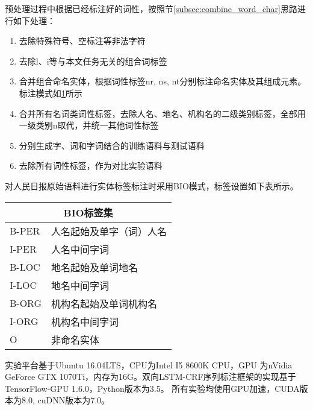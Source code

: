 预处理过程中根据已经标注好的词性，按照节\ref{subsec:combine_word_char}思路进行如下处理：
\begin{enumerate}[leftmargin=*]
    \item[(1)] 去除特殊符号、空标注等非法字符
    \item[(2)] 去除l、i等与本文任务无关的组合词标签
    \item[(3)] 合并组合命名实体，根据词性标签nr, ns, nt分别标注命名实体及其组成元素。标注模式如\ref{tab:label_schema}所示
    \item[(4)] 合并所有名词类词性标签，去除人名、地名、机构名的二级类别标签，全部用一级类别n取代，并统一其他词性标签
    \item[(5)] 分别生成字、词和字词结合的训练语料与测试语料
    \item[(6)] 去除所有词性标签，作为对比实验语料
\end{enumerate}

对人民日报原始语料进行实体标签标注时采用BIO模式，标签设置如下表所示。

\begin{table}[H]
    \centering
    \begin{tabular}{ll}
        \toprule
        \multicolumn{2}{c}{BIO标签集}\\
        \midrule
        B-PER & 人名起始及单字（词）人名 \\
        I-PER & 人名中间字词 \\
        B-LOC & 地名起始及单词地名 \\
        I-LOC & 地名中间字词 \\
        B-ORG & 机构名起始及单词机构名 \\
        I-ORG & 机构名中间字词 \\
        O & 非命名实体\\
        \bottomrule
    \end{tabular}
    \label{tab:label_schema}
\end{table}

实验平台基于Ubuntu 16.04LTS，CPU为Intel I5 8600K CPU，GPU 为nVidia GeForce GTX 1070Ti，内存为16G。双向LSTM-CRF序列标注框架的实现基于TensorFlow-GPU 1.6.0，Python版本为3.5。
所有实验均使用GPU加速，CUDA版本为8.0, cuDNN版本为7.0。


